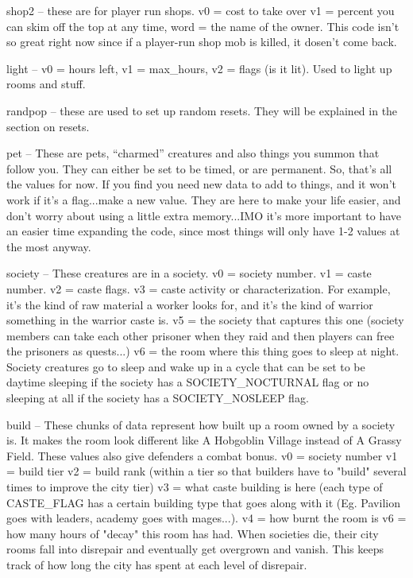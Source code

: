 \bul shop2 -- these are for player run shops. v0 = cost to take over
v1 = percent you can skim off the top at any time, word = the name of
the owner. This code isn't so great right now since if a player-run
shop mob is killed, it dosen't come back.

\bul light -- v0 = hours left, v1 = max\_hours, v2 = flags (is it
lit). Used to light up rooms and stuff.

\bul randpop -- these are used to set up random resets. They will be explained in the section on resets.

\bul pet -- These are pets, ``charmed'' creatures and also things you summon
        that follow you. They can either be set to be timed, or are permanent.
So, that's all the values for now. If you find you need new data to add to things, and it won't work if it's a flag...make a new value. They are here to make your life easier, and don't worry about using a little extra memory...IMO it's more important to have an easier time expanding the code, since most things will only have 1-2 values at the most anyway.

\bul society -- These creatures are in a society. v0 = society number. v1 =
caste number. v2 = caste flags. v3 = caste activity or characterization. For
example, it's the kind of raw material a worker looks for, and it's the kind
of warrior something in the warrior caste is. v5 = the society that captures
this one (society members can take each other prisoner when they raid and
then players can free the prisoners as quests...) v6 = the room where this
thing goes to sleep at night. Society creatures go to sleep and wake up
in a cycle that can be set to be daytime sleeping if the society has
a SOCIETY\_NOCTURNAL flag or no sleeping at all if the society has a 
SOCIETY\_NOSLEEP flag.


\bul build -- These chunks of data represent how built up a room owned
by a society is. It makes the room look different like A Hobgoblin Village
instead of A Grassy Field. These values also give defenders a combat
bonus. v0 = society number v1 = build tier v2 = build rank (within a tier
so that builders have to "build" several times to improve the city tier)
v3 = what caste building is here (each type of CASTE\_FLAG has a certain
building type that goes along with it (Eg. Pavilion goes with leaders,
academy goes with mages...). v4 = how burnt the room is v6 = how many hours 
of "decay" this room has had. When societies die, their city rooms fall
into disrepair and eventually get overgrown and vanish. This keeps track
of how long the city has spent at each level of disrepair.

